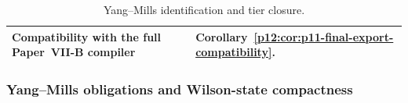 \documentclass[12pt,a4paper]{article}
\begin{document}
\begin{table}[htbp]
\begin{tabularx}{\textwidth}{@{}
>{\raggedright\arraybackslash}p{}
>{\raggedright\arraybackslash}X
@{}}
Compatibility with the full Paper~VII-B compiler
& Corollary~\ref{p12:cor:p11-final-export-compatibility}. \\
\bottomrule
\end{tabularx}
\caption[Yang--Mills identification and tier closure]{Yang--Mills identification and tier closure.}
\label{p12:tab:ym-identification-tier-closure}
\label{p12:tab:ym-identification-ledger}
\end{table}


\subsubsection{Yang--Mills obligations and Wilson-state compactness}
\label{p12:subsec:ym-obligations-wilson-compactness}
\end{document}
